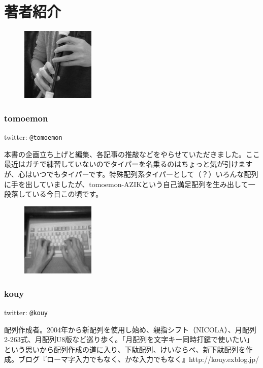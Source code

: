
\vspace{10mm}

\part*{著者紹介}

\begin{figure}
\includegraphics[width=3.5cm,clip]{res_author/tomoemon_temoto.eps}
\end{figure}
\section*{tomoemon}
twitter: \verb|@tomoemon|

本書の企画立ち上げと編集、各記事の推敲などをやらせていただきました。ここ最近はガチで練習していないのでタイパーを名乗るのはちょっと気が引けますが、心はいつでもタイパーです。特殊配列系タイパーとして（？）いろんな配列に手を出していましたが、tomoemon-AZIKという自己満足配列を生み出して一段落している今日この頃です。

\vspace{5mm}

\begin{figure}
\includegraphics[width=3.5cm,clip]{res_author/kouy_temoto.eps}
\end{figure}
\section*{kouy}
twitter: \verb|@kouy|

配列作成者。2004年から新配列を使用し始め、親指シフト（NICOLA）、月配列2-263式、月配列U8版など巡り歩く。「月配列を文字キー同時打鍵で使いたい」という思いから配列作成の道に入り、下駄配列、けいならべ、新下駄配列を作成。ブログ『ローマ字入力でもなく、かな入力でもなく』http://kouy.exblog.jp/

